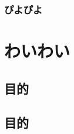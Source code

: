 \subsubsection{ぴよぴよ}\label{ux3074ux3088ux3074ux3088}

\section{わいわい}\label{ux308fux3044ux308fux3044}

\subsection{目的}\label{ux76eeux7684-1}

\subsection{目的}\label{ux76eeux7684-2}
